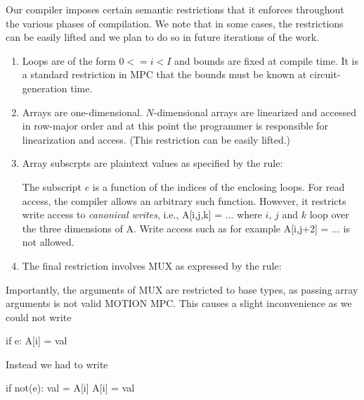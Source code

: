 Our compiler imposes certain semantic restrictions that it enforces throughout the various
phases of compilation. We note that in some cases, the restrictions
can be easily lifted and we plan to do so in future iterations of the work.

\begin{enumerate}
\item Loops are of the form $0 <= i < I$ and bounds are fixed at compile time.
It is a standard restriction in MPC that the bounds must be known at circuit-generation time.
\item Arrays are one-dimensional. $N$-dimensional arrays are linearized and accessed
in row-major order and at this point the programmer is responsible for linearization
and access. (This restriction can be easily lifted.)
\item Array subscrpts are plaintext values as specified by the rule:
\begin{semantics}
\end{semantics}
The subscript $e$ is a function of the indices of the enclosing loops.
For read access, the compiler allows an arbitrary such function.
However, it restricts write access to \emph{canonical writes}, i.e., {\sf A[i,j,k] = ...}
where $i$, $j$ and $k$ loop over the three dimensions of {\sf A}.
Write access such as for example {\sf A[i,j+2] = ...} is not allowed.
\item The final restriction involves MUX as expressed by the rule:
\begin{semantics}
\end{semantics}
\end{enumerate}
Importantly, the arguments of MUX are restricted to base types, as passing array arguments
is not valid MOTION MPC.  This causes a slight inconvenience as we could not write
\begin{pythonn}
if e: A[i] = val
\end{pythonn}
Instead we had to write
\begin{pythonn}
if not(e): val = A[i]
A[i] = val
\end{pythonn}

